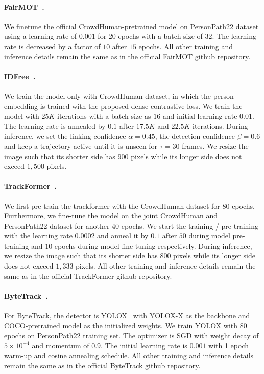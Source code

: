 \documentclass[runningheads]{llncs}
\begin{document}
\paragraph{FairMOT~\cite{fairmot}.} We finetune the official CrowdHuman-pretrained model on PersonPath22 dataset using a learning rate of $0.001$ for $20$ epochs with a batch size of $32$. The learning rate is decreased by a factor of $10$ after $15$ epochs. All other training and inference details remain the same as in the official FairMOT github repository.


\paragraph{IDFree~\cite{pointid}.} We train the model only with CrowdHuman dataset, in which the person embedding is trained with the proposed dense contrastive loss. We train the model with $25K$ iterations with a batch size as $16$ and initial learning rate $0.01$. The learning rate is annealed by $0.1$ after $17.5K$ and $22.5K$ iterations.  During inference, we set the linking confidence $\alpha = 0.45$, the detection confidence $\beta = 0.6$ and keep a trajectory active until it is unseen for $\tau = 30$ frames. We resize the image such that its shorter side has $900$ pixels while its longer side does not exceed $1,500$ pixels.

\paragraph{TrackFormer~\cite{trackformer}.} We first pre-train the trackformer with the CrowdHuman dataset for 80 epochs. Furthermore, we fine-tune the model on the joint CrowdHuman and PersonPath22 dataset for another 40 epochs. We start the training / pre-training with the learning rate $0.0002$ and anneal it by $0.1$ after $50$ during model pre-training and $10$ epochs during model fine-tuning respectively. During inference, we resize the image such that its shorter side has $800$ pixels while its longer side does not exceed $1,333$ pixels. All other training and inference details remain the same as in the official TrackFormer github repository.

\paragraph{ByteTrack~\cite{bytetrack}.} For ByteTrack, the detector is YOLOX~\cite{yolox} with YOLOX-X as the backbone and COCO-pretrained model as the initialized weights. We train YOLOX with 80 epochs on PersonPath22 training set. The optimizer is
SGD with weight decay of $5 \times 10^{-4}$ and momentum of $0.9$. The initial learning rate is $0.001$ with 1 epoch warm-up and cosine annealing schedule. All other training and inference details remain the same as in the official ByteTrack github repository.  
\end{document}
